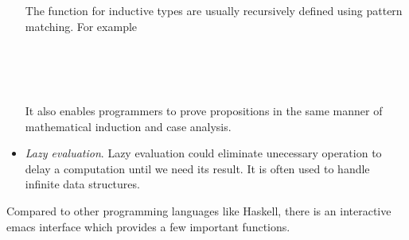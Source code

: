 \begin{itemize}
The function for inductive types are usually recursively defined using pattern matching. For example
\begin{code}\>\<%
\\
\> \AgdaSymbol{:}   \<%
\\
\>  \AgdaSymbol{=} \<%
\\
\> \AgdaSymbol{(} \AgdaSymbol{)} \AgdaSymbol{=}  \AgdaSymbol{(} \AgdaSymbol{(} \AgdaSymbol{))}\<%
\>\<\end{code}

It also enables programmers to prove propositions in the same manner of mathematical induction and case analysis.

\item \textit{Lazy evaluation}. Lazy evaluation could eliminate unecessary operation to delay a computation until we need its result. It is often used to handle infinite data structures. \cite{wiki:Lazy_evaluation}

\end{itemize}

Compared to other programming languages like Haskell, there is an interactive emacs interface which provides a few important functions.

